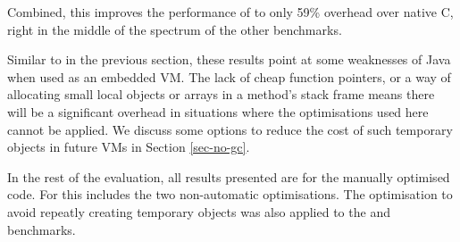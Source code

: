 Combined, this improves the performance of  to only 59\% overhead over native C, right in the middle of the spectrum of the other benchmarks.

Similar to  in the previous section, these results point at some weaknesses of Java when used as an embedded VM. The lack of cheap function pointers, or a way of allocating small local objects or arrays in a method's stack frame means there will be a significant overhead in situations where the optimisations used here cannot be applied. We discuss some options to reduce the cost of such temporary objects in future VMs in Section \ref{sec-no-gc}.

In the rest of the evaluation, all results presented are for the manually optimised code. For  this includes the two non-automatic optimisations. The optimisation to avoid repeatly creating temporary objects was also applied to the  and  benchmarks.
